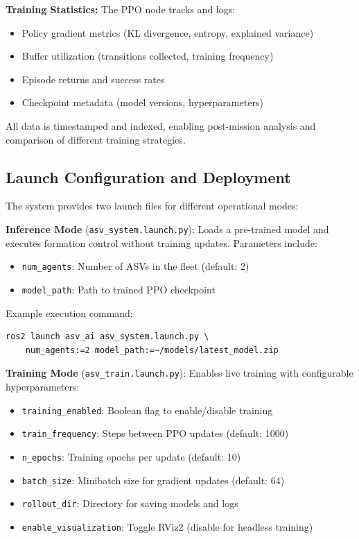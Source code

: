 \documentclass[preprint,3p]{elsarticle}
\begin{document}
\vspace{1em}

\textbf{Training Statistics:} The PPO node tracks and logs:
\begin{itemize}
    \item Policy gradient metrics (KL divergence, entropy, explained variance)
    \item Buffer utilization (transitions collected, training frequency)
    \item Episode returns and success rates
    \item Checkpoint metadata (model versions, hyperparameters)
\end{itemize}

All data is timestamped and indexed, enabling post-mission analysis and comparison of different training strategies.

\subsection{Launch Configuration and Deployment}

The system provides two launch files for different operational modes:

\vspace{1em}

\textbf{Inference Mode} (\texttt{asv\_system.launch.py}): Loads a pre-trained model and executes formation control without training updates. Parameters include:
\begin{itemize}
    \item \texttt{num\_agents}: Number of ASVs in the fleet (default: 2)
    \item \texttt{model\_path}: Path to trained PPO checkpoint
\end{itemize}

Example execution command:
\begin{verbatim}
ros2 launch asv_ai asv_system.launch.py \
    num_agents:=2 model_path:=~/models/latest_model.zip
\end{verbatim}

\vspace{1em}

\textbf{Training Mode} (\texttt{asv\_train.launch.py}): Enables live training with configurable hyperparameters:
\begin{itemize}
    \item \texttt{training\_enabled}: Boolean flag to enable/disable training
    \item \texttt{train\_frequency}: Steps between PPO updates (default: 1000)
    \item \texttt{n\_epochs}: Training epochs per update (default: 10)
    \item \texttt{batch\_size}: Minibatch size for gradient updates (default: 64)
    \item \texttt{rollout\_dir}: Directory for saving models and logs
    \item \texttt{enable\_visualization}: Toggle RViz2 (disable for headless training)
\end{itemize}
\end{document}
